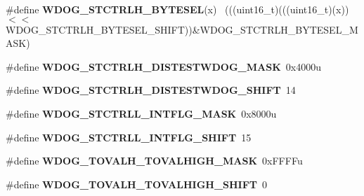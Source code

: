 \begin{DoxyCompactItemize}
\item 
\hypertarget{group___w_d_o_g___register___masks_ga55e244387ea5a80b67dceb3e86af7160}{}\#define {\bfseries W\+D\+O\+G\+\_\+\+S\+T\+C\+T\+R\+L\+H\+\_\+\+B\+Y\+T\+E\+S\+E\+L}(x)                                ~(((uint16\+\_\+t)(((uint16\+\_\+t)(x))$<$$<$W\+D\+O\+G\+\_\+\+S\+T\+C\+T\+R\+L\+H\+\_\+\+B\+Y\+T\+E\+S\+E\+L\+\_\+\+S\+H\+I\+F\+T))\&W\+D\+O\+G\+\_\+\+S\+T\+C\+T\+R\+L\+H\+\_\+\+B\+Y\+T\+E\+S\+E\+L\+\_\+\+M\+A\+S\+K)\label{group___w_d_o_g___register___masks_ga55e244387ea5a80b67dceb3e86af7160}

\item 
\hypertarget{group___w_d_o_g___register___masks_gadc235bcbd7644d445d3ca5cb682cdc57}{}\#define {\bfseries W\+D\+O\+G\+\_\+\+S\+T\+C\+T\+R\+L\+H\+\_\+\+D\+I\+S\+T\+E\+S\+T\+W\+D\+O\+G\+\_\+\+M\+A\+S\+K}~0x4000u\label{group___w_d_o_g___register___masks_gadc235bcbd7644d445d3ca5cb682cdc57}

\item 
\hypertarget{group___w_d_o_g___register___masks_gabc176648bbc119e959823d20c38d3ece}{}\#define {\bfseries W\+D\+O\+G\+\_\+\+S\+T\+C\+T\+R\+L\+H\+\_\+\+D\+I\+S\+T\+E\+S\+T\+W\+D\+O\+G\+\_\+\+S\+H\+I\+F\+T}~14\label{group___w_d_o_g___register___masks_gabc176648bbc119e959823d20c38d3ece}

\item 
\hypertarget{group___w_d_o_g___register___masks_ga28985249246b9ad12b7f4e50d5d1ee46}{}\#define {\bfseries W\+D\+O\+G\+\_\+\+S\+T\+C\+T\+R\+L\+L\+\_\+\+I\+N\+T\+F\+L\+G\+\_\+\+M\+A\+S\+K}~0x8000u\label{group___w_d_o_g___register___masks_ga28985249246b9ad12b7f4e50d5d1ee46}

\item 
\hypertarget{group___w_d_o_g___register___masks_ga672e303cca0aaea64e48b5e632a2e666}{}\#define {\bfseries W\+D\+O\+G\+\_\+\+S\+T\+C\+T\+R\+L\+L\+\_\+\+I\+N\+T\+F\+L\+G\+\_\+\+S\+H\+I\+F\+T}~15\label{group___w_d_o_g___register___masks_ga672e303cca0aaea64e48b5e632a2e666}

\item 
\hypertarget{group___w_d_o_g___register___masks_ga3b934300a204f2b11fefc7961dc25f55}{}\#define {\bfseries W\+D\+O\+G\+\_\+\+T\+O\+V\+A\+L\+H\+\_\+\+T\+O\+V\+A\+L\+H\+I\+G\+H\+\_\+\+M\+A\+S\+K}~0x\+F\+F\+F\+Fu\label{group___w_d_o_g___register___masks_ga3b934300a204f2b11fefc7961dc25f55}

\item 
\hypertarget{group___w_d_o_g___register___masks_ga6729532c2b047c0d3327ffcf7357825c}{}\#define {\bfseries W\+D\+O\+G\+\_\+\+T\+O\+V\+A\+L\+H\+\_\+\+T\+O\+V\+A\+L\+H\+I\+G\+H\+\_\+\+S\+H\+I\+F\+T}~0\label{group___w_d_o_g___register___masks_ga6729532c2b047c0d3327ffcf7357825c}


\end{DoxyCompactItemize}
